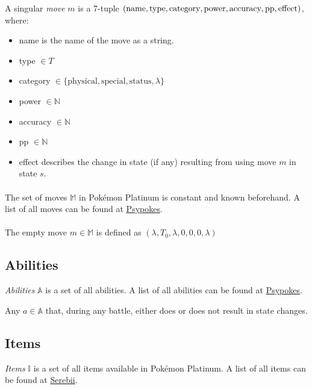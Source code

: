 A singular \emph{move} $m$ is a 7-tuple $(\text{name}, \text{type}, \text{category}, \break \text{power}, \text{accuracy}, \text{pp}, \text{effect})$, where:
\begin{itemize}
    \item name is the name of the move as a string.
    \item type $\in T$
    \item category $\in \{ \text{physical}, \text{special}, \text{status}, \lambda \}$
    \item power $\in \mathbb{N}$ 
    \item accuracy $\in \mathbb{N}$ 
    \item pp $\in \mathbb{N}$
    \item effect describes the change in state (if any) resulting from using move $m$ in state $s$.
\end{itemize}

\paragraph{}
The set of moves $\mathbb{M}$ in Pokémon Platinum is constant and known beforehand. A list of all moves can be found at \href{http://www.psypokes.com/dpphgss/attacks.php}{Psypokes}.

\paragraph{}
The empty move $m \in \mathbb{M}$ is defined as $(\lambda, T_0, \lambda, 0, 0, 0, \lambda)$

\subsection{Abilities}

\emph{Abilities} $\mathbb{A}$ is a set of all abilities. A list of all abilities can be found at \href{http://www.psypokes.com/dpphgss/abilities.php}{Psypokes}.

Any $a \in \mathbb{A}$ that, during any battle, either does or does not result in state changes.

\subsection{Items}

\emph{Items} $\mathbb{I}$ is a set of all items available in Pokémon Platinum. A list of all items can be found at \href{https://www.serebii.net/platinum/items.shtml}{Serebii}.

